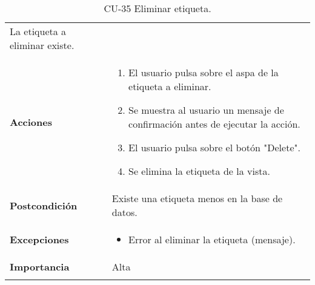 \begin{longtable}[]{@{}ll@{}}
\begin{minipage}[t]{0.72\columnwidth}
La etiqueta a eliminar existe.\strut
\end{minipage}\tabularnewline
\begin{minipage}[t]{0.22\columnwidth}\raggedright
\textbf{Acciones}\strut
\end{minipage} & \begin{minipage}[t]{0.72\columnwidth}\raggedright
\begin{enumerate}
\def\labelenumi{\arabic{enumi}.}
\tightlist
\item
  El usuario pulsa sobre el aspa de la etiqueta a eliminar.
\item
  Se muestra al usuario un mensaje de confirmación antes de ejecutar la
  acción.
\item
  El usuario pulsa sobre el botón "Delete".
\item
  Se elimina la etiqueta de la vista.
\end{enumerate}\strut
\end{minipage}\tabularnewline
\begin{minipage}[t]{0.22\columnwidth}\raggedright
\textbf{Postcondición}\strut
\end{minipage} & \begin{minipage}[t]{0.72\columnwidth}\raggedright
Existe una etiqueta menos en la base de datos.\strut
\end{minipage}\tabularnewline
\begin{minipage}[t]{0.22\columnwidth}\raggedright
\textbf{Excepciones}\strut
\end{minipage} & \begin{minipage}[t]{0.72\columnwidth}\raggedright
\begin{itemize}
\tightlist
\item
  Error al eliminar la etiqueta (mensaje).
\end{itemize}\strut
\end{minipage}\tabularnewline
\begin{minipage}[t]{0.22\columnwidth}\raggedright
\textbf{Importancia}\strut
\end{minipage} & \begin{minipage}[t]{0.72\columnwidth}\raggedright
Alta\strut
\end{minipage}\tabularnewline
\bottomrule
\caption{CU-35 Eliminar etiqueta.}
\end{longtable}

